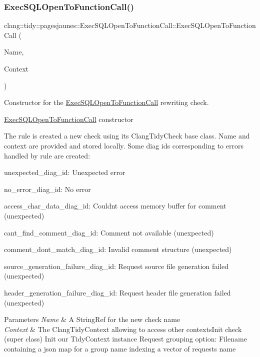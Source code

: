 \subsubsection{\texorpdfstring{Exec\+S\+Q\+L\+Open\+To\+Function\+Call()}{ExecSQLOpenToFunctionCall()}}
{\footnotesize\ttfamily clang\+::tidy\+::pagesjaunes\+::\+Exec\+S\+Q\+L\+Open\+To\+Function\+Call\+::\+Exec\+S\+Q\+L\+Open\+To\+Function\+Call (\begin{DoxyParamCaption}\item[{String\+Ref}]{Name,  }\item[{Clang\+Tidy\+Context $\ast$}]{Context }\end{DoxyParamCaption})}



Constructor for the \hyperlink{classclang_1_1tidy_1_1pagesjaunes_1_1_exec_s_q_l_open_to_function_call}{Exec\+S\+Q\+L\+Open\+To\+Function\+Call} rewriting check. 

\hyperlink{classclang_1_1tidy_1_1pagesjaunes_1_1_exec_s_q_l_open_to_function_call}{Exec\+S\+Q\+L\+Open\+To\+Function\+Call} constructor

The rule is created a new check using its {\ttfamily Clang\+Tidy\+Check} base class. Name and context are provided and stored locally. Some diag ids corresponding to errors handled by rule are created\+:
\begin{DoxyItemize}
\item unexpected\+\_\+diag\+\_\+id\+: Unexpected error
\item no\+\_\+error\+\_\+diag\+\_\+id\+: No error
\item access\+\_\+char\+\_\+data\+\_\+diag\+\_\+id\+: Couldn\textquotesingle{}t access memory buffer for comment (unexpected)
\item cant\+\_\+find\+\_\+comment\+\_\+diag\+\_\+id\+: Comment not available (unexpected)
\item comment\+\_\+dont\+\_\+match\+\_\+diag\+\_\+id\+: Invalid comment structure (unexpected)
\item source\+\_\+generation\+\_\+failure\+\_\+diag\+\_\+id\+: Request source file generation failed (unexpected)
\item header\+\_\+generation\+\_\+failure\+\_\+diag\+\_\+id\+: Request header file generation failed (unexpected)
\end{DoxyItemize}


\begin{DoxyParams}{Parameters}
{\em Name} & A String\+Ref for the new check name \\
\hline
{\em Context} & The Clang\+Tidy\+Context allowing to access other contexts\+Init check (super class) Init our Tidy\+Context instance Request grouping option\+: Filename containing a json map for a group name indexing a vector of requests name \\
\hline
\end{DoxyParams}


